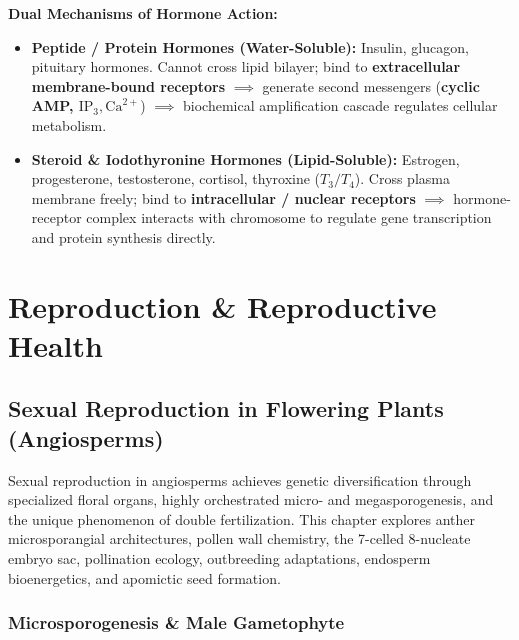 \documentclass[10pt,twoside,openright]{book}
\begin{document}
\begin{conceptbox}
\textbf{Dual Mechanisms of Hormone Action:}
\begin{itemize}
  \item \textbf{Peptide / Protein Hormones (Water-Soluble):} Insulin, glucagon, pituitary hormones. Cannot cross lipid bilayer; bind to \textbf{extracellular membrane-bound receptors} $\implies$ generate second messengers (\textbf{cyclic AMP, $\mathrm{IP}_3, \mathrm{Ca}^{2+}$}) $\implies$ biochemical amplification cascade regulates cellular metabolism.
  \item \textbf{Steroid \& Iodothyronine Hormones (Lipid-Soluble):} Estrogen, progesterone, testosterone, cortisol, thyroxine ($T_3/T_4$). Cross plasma membrane freely; bind to \textbf{intracellular / nuclear receptors} $\implies$ hormone-receptor complex interacts with chromosome to regulate gene transcription and protein synthesis directly.
\end{itemize}
\end{conceptbox}


\part{Reproduction \& Reproductive Health}

\chapter{Sexual Reproduction in Flowering Plants (Angiosperms)}

Sexual reproduction in angiosperms achieves genetic diversification through specialized floral organs, highly orchestrated micro- and megasporogenesis, and the unique phenomenon of double fertilization. This chapter explores anther microsporangial architectures, pollen wall chemistry, the 7-celled 8-nucleate embryo sac, pollination ecology, outbreeding adaptations, endosperm bioenergetics, and apomictic seed formation.

\section{Microsporogenesis \& Male Gametophyte}
\end{document}
